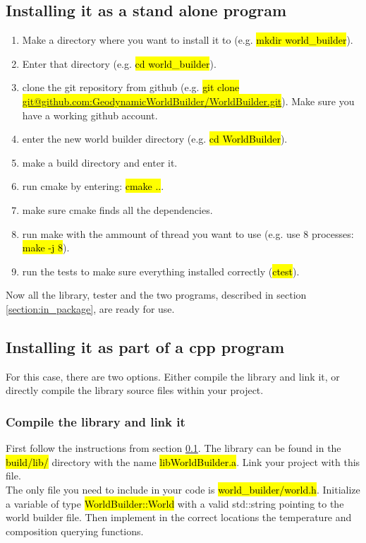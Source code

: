 \documentclass{book}
\begin{document}
\subsection{Installing it as a stand alone program}
\label{subsection:install_stand_aline}
\begin{enumerate}
    \item Make a directory where you want to install it to (e.g. \hl{mkdir world\_builder}).
    \item Enter that directory (e.g. \hl{cd world\_builder}).
    \item clone the git repository from github (e.g. \hl{git clone  \\ \hbox{\url{ git@github.com:GeodynamicWorldBuilder/WorldBuilder.git}}}). Make sure you have a working github account.
    \item enter the new world builder directory (e.g. \hl{cd WorldBuilder}).
    \item make a build directory and enter it.
    \item run cmake by entering: \hl{cmake ..}.
    \item make sure cmake finds all the dependencies.
    \item run make with the ammount of thread you want to use (e.g. use 8 processes: \hl{make -j 8}).
    \item run the tests to make sure everything installed correctly (\hl{ctest}).
\end{enumerate}
Now all the library, tester and the two programs, described in section \ref{section:in_package}, are ready for use.

\subsection{Installing it as part of a cpp program}
For this case, there are two options. Either compile the library and link it, or directly compile the library source files within your project.

\subsubsection{Compile the library and link it}
First follow the instructions from section \ref{subsection:install_stand_aline}. The library can be found in the \hl{build/lib/} directory with the name \hl{libWorldBuilder.a}. Link your project with this file. 
\\
The only file you need to include in your code is \hl{world\_builder/world.h}. Initialize a variable of type \hl{WorldBuilder::World} with a valid std::string pointing to the world builder file. Then implement in the correct locations the temperature and composition querying functions.
\end{document}
